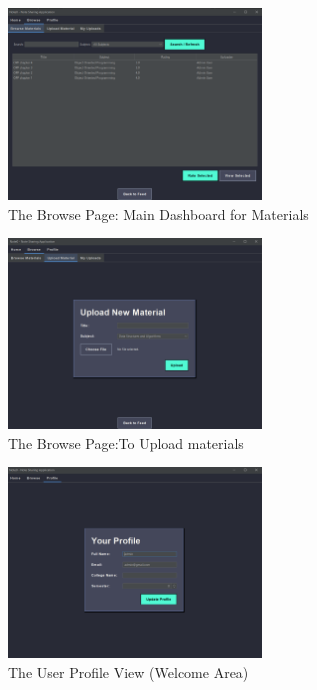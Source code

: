 \documentclass[12pt, a4paper]{report}
\begin{document}
\begin{itemize}
\begin{figure}[h!]
    \centering
    \includegraphics[width=0.6\textwidth]{new_images_note/browse_page.png} %
    \caption{The Browse Page: Main Dashboard for Materials}
    \label{fig:browse_page}
\end{figure}
\begin{figure}[h!]
    \centering
    \includegraphics[width=0.6\textwidth]{new_images_note/browse_upload.png} %
    \caption{The Browse Page:To Upload materials}
    \label{fig:browse_page}
\end{figure}
\begin{figure}[h!]
    \centering
    \includegraphics[width=0.6\textwidth]{new_images_note/profile_page.png} %
    \caption{The User Profile View (Welcome Area)}
    \label{fig:profile_page}
\end{figure}


\end{itemize}
\end{document}
